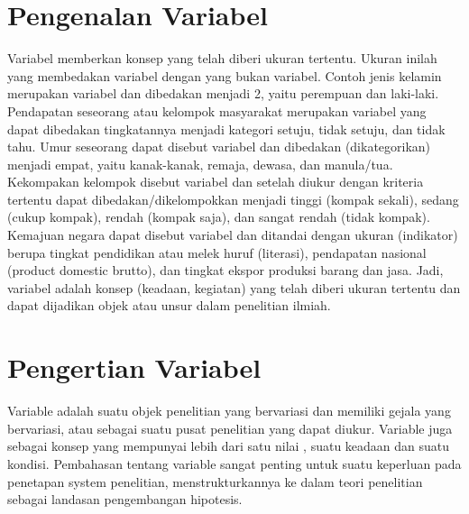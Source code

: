 

\section{Pengenalan Variabel}
Variabel memberkan konsep yang telah diberi ukuran tertentu. Ukuran inilah yang membedakan variabel dengan yang bukan variabel. 
Contoh jenis kelamin merupakan variabel dan dibedakan menjadi 2, yaitu perempuan dan laki-laki. Pendapatan seseorang atau 
kelompok masyarakat merupakan variabel yang dapat dibedakan tingkatannya menjadi kategori setuju, tidak setuju, dan tidak tahu. 
Umur seseorang dapat disebut variabel dan dibedakan (dikategorikan) menjadi empat, yaitu kanak-kanak, remaja, dewasa, dan 
manula/tua. Kekompakan kelompok disebut variabel dan setelah diukur dengan kriteria tertentu dapat dibedakan/dikelompokkan 
menjadi tinggi (kompak sekali), sedang (cukup kompak), rendah (kompak saja), dan sangat rendah (tidak kompak). Kemajuan negara 
dapat disebut variabel dan ditandai dengan ukuran (indikator) berupa tingkat pendidikan atau melek huruf (literasi), pendapatan 
nasional (product domestic brutto), dan tingkat ekspor produksi barang dan jasa. Jadi, variabel adalah konsep (keadaan, 
kegiatan) yang telah diberi ukuran tertentu dan dapat dijadikan objek atau unsur dalam penelitian ilmiah.

\section{Pengertian Variabel}
Variable adalah suatu objek penelitian yang bervariasi dan memiliki gejala yang bervariasi, atau sebagai suatu pusat penelitian yang dapat 
diukur. Variable juga sebagai konsep yang mempunyai  lebih dari satu nilai , suatu keadaan dan suatu kondisi. Pembahasan tentang variable 
sangat  penting  untuk suatu keperluan pada penetapan system penelitian, menstrukturkannya ke dalam teori penelitian sebagai landasan 
pengembangan hipotesis.

